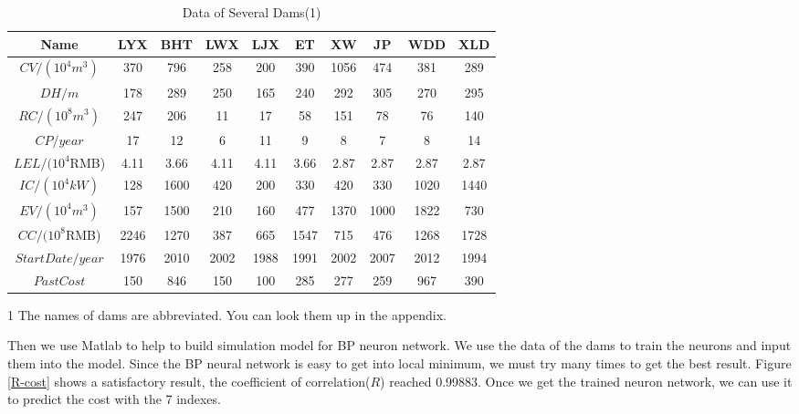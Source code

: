 \documentclass[12pt]{article}%
\begin{document}
\begin{table}
\footnotesize
\centering  
\caption{Data of Several Dams(1)}
\label{dam}
\begin{tabular}{|cccccccccc|}
\hline
Name  &  LYX  &  BHT  &  LWX  &  LJX  &  ET  &  XW  &  JP  &  WDD  &  XLD\\
\hline
$CV/(10^4 m^3)$  &  370  &  796  &  258  &  200  &  390  &  1056  &  474  &  381  &  289\\
\hline
$DH/m$  &  178  &  289  &  250  &  165  &  240  &  292  &  305  &  270  &  295\\
\hline
$RC/(10^8 m^3)$  &  247  &  206  &  11  &  17  &  58  &  151  &  78  &  76  &  140\\
\hline
$CP/year$  &  17  &  12  &  6  &  11  &  9  &  8  &  7  &  8  &  14\\
\hline
$LEL/(10^4$RMB)  &  4.11  &  3.66  &  4.11  &  4.11  &  3.66  &  2.87 & 2.87   &  2.87  &  2.87\\
\hline
$IC/(10^4 kW)$  &  128  &  1600  &  420  &  200  &  330  &  420  &  330  &  1020  &  1440\\
\hline
$EV/(10^4 m^3)$  &  157  &  1500  &  210  &  160  &  477  &  1370  &  1000  &  1822  &  730\\
\hline
$CC/(10^8$RMB)  &  2246  &  1270  &  387  &  665  &  1547  &  715  &  476  &  1268  &  1728\\
\hline
$StartDate/year$  &  1976  &  2010  &  2002  &  1988  &  1991  &  2002  &  2007  &  2012  &  1994\\
\hline
$Past Cost$  &  150  &  846  &  150  &  100  &  285  &  277  &  259  &  967  &  390\\
\hline
\end{tabular}
\begin{tablenotes}
        \footnotesize
        \item[1] The names of dams are abbreviated. You can look them up in the appendix.
      \end{tablenotes}
\end{table}
Then we use Matlab to help to build simulation model for BP neuron network. We use the data of the dams to train the neurons and input them into the model. Since the BP neural network is easy to get into local minimum, we must try many times to get the best result. Figure \ref{R-cost} shows a satisfactory result, the coefficient of correlation($R$) reached 0.99883. Once we get the trained neuron network, we can use it to predict the cost with the 7 indexes.
\end{document}
